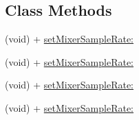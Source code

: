 \subsection*{Class Methods}
\begin{DoxyCompactItemize}
\item 
(void) + \hyperlink{interfaceCDSoundEngine_ab917455684b0ff4ea92e3d2a82d3530c}{set\+Mixer\+Sample\+Rate\+:}
\item 
(void) + \hyperlink{interfaceCDSoundEngine_ab917455684b0ff4ea92e3d2a82d3530c}{set\+Mixer\+Sample\+Rate\+:}
\item 
(void) + \hyperlink{interfaceCDSoundEngine_ab917455684b0ff4ea92e3d2a82d3530c}{set\+Mixer\+Sample\+Rate\+:}
\item 
(void) + \hyperlink{interfaceCDSoundEngine_ab917455684b0ff4ea92e3d2a82d3530c}{set\+Mixer\+Sample\+Rate\+:}
\end{DoxyCompactItemize}
